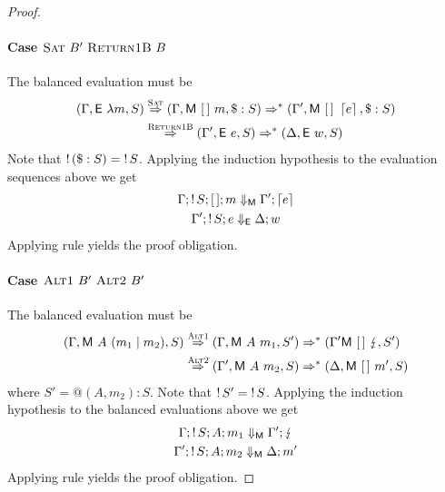 \begin{proof}
  \paragraph{Case $\textsc{Sat}~B'~\textsc{Return1B}~B$}
  The balanced evaluation must be
  \[
    \begin{split}
      (\Gamma, \textsf{E}~\lambda m, S) & \stackrel{\textsc{Sat}}{\Rightarrow}
      (\Gamma, \textsf{M}~[\,]~m, \$:S) \Rightarrow^{*}
      (\Gamma', \textsf{M}~[\,]~\left\lceil e\right\rceil, \$:S) \\
      & \stackrel{\textsc{Return1B}}{\Rightarrow}
      (\Gamma', \textsf{E}~e, S) \Rightarrow^{*}
      (\Delta, \textsf{E}~w, S)
    \end{split}
  \]
  Note that $\mathop{!}{(\$:S)} = \mathop{!}{S}$.
  Applying the induction hypothesis to the evaluation sequences above we get
  \begin{gather*}
    \Gamma;\mathop{!}{S}; [\,]; m \Downarrow_{\textsf{M}} \Gamma'; \left\lceil e\right\rceil \\
    \Gamma';\mathop{!}{S}; e \Downarrow_{\textsf{E}} \Delta; w
  \end{gather*}
  Applying rule  yields the proof obligation.

  \paragraph{Case $\textsc{Alt1}~B'~\textsc{Alt2}~B'$}
  The balanced evaluation must be
  \[ \begin{split}
      (\Gamma, \textsf{M}~A~(m_1 \mid m_2), S) &
      \stackrel{\textsc{Alt1}}{\Rightarrow}
      (\Gamma, \textsf{M}~A~m_1, S') \Rightarrow^{*}
      (\Gamma' \textsf{M}~[\,]~\lightning, S') \\
      & \stackrel{\textsc{Alt2}}{\Rightarrow}
    (\Gamma', \textsf{M}~A~m_2, S) \Rightarrow^{*}
    (\Delta, \textsf{M}~[\,]~m', S)
      \end{split}
  \]
  where $S' = @(A,m_2):S$.  Note that $\mathop{!}{S'} = \mathop{!}{S}$. Applying
  the induction hypothesis to the balanced evaluations above we get
  \begin{gather*}
    \Gamma;\mathop{!}{S};A;m_1 \Downarrow_{\textsf{M}} \Gamma'; \lightning \\
    \Gamma';\mathop{!}{S};A;m_2 \Downarrow_{\textsf{M}} \Delta; m'
  \end{gather*}
  Applying rule  yields the proof obligation.
\end{proof}

